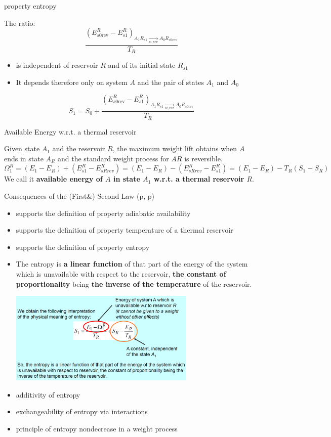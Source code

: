 \begin{defn}
    property entropy
    
    The ratio:
\[
\frac{\left(E_{s0\text{rev}}^R - E_{s1}^R\right)_{A_1 R_{s1} \underset{w,rev}{\rightarrow} A_0 R_{s0\text{rev}}}}{T_R}
\]
\begin{itemize}
    \item is independent of reservoir \( R \) and of its initial state \( R_{s1} \)
    \item It depends therefore only on system \( A \) and the pair of states \( A_1 \) and \( A_0 \)
\end{itemize}
\[
S_1 = S_0 + \frac{\left(E_{s0\text{rev}}^R - E_{s1}^R\right)_{A_1 R_{s1} \underset{w,rev}{\rightarrow} A_0 R_{s0\text{rev}}}}{T_R}
\]
\end{defn}
\begin{defn}
    Available Energy w.r.t. a thermal reservoir

    Given state \( A_1 \) and the reservoir \( R \), 
    the maximum weight lift obtains when \( A \) ends 
    in state \( A_R \) and the standard weight process for \( AR \) is reversible.
    \[\Omega_1^R=(E_1-E_R)+(E^R_{s1}-E^R_{sRrev})
    =(E_1-E_R)-(E^R_{sRrev}-E^R_{s1})=(E_1-E_R)-T_R(S_1-S_R)\]
    We call it \textbf{available energy of \(A\) in state \(A_1\) w.r.t. a thermal reservoir \(R\)}.
\end{defn}
\begin{thm}\label{cfsl2}
    Consequences of the (First\&) Second Law (p\pageref{cfsl1}\;,\; p\pageref{cfsl3})
    \begin{itemize}
        \item supports the definition of property adiabatic availability
        \item supports the definition of property temperature of a thermal reservoir
        \item supports the definition of property entropy
        \item The entropy is \textbf{a linear function} of that part of the energy of the system which  
        is unavailable with respect to the reservoir, \textbf{the constant of proportionality} being \textbf{the  
        inverse of the temperature} of the reservoir.
        \begin{center}
            \includegraphics[width=0.7\textwidth]{chap1/2.1.png}
        \end{center}
        \item additivity of entropy 
        \item exchangeability of entropy via interactions
        \item principle of entropy non\textminus decrease in a weight process
    \end{itemize}
\end{thm}
